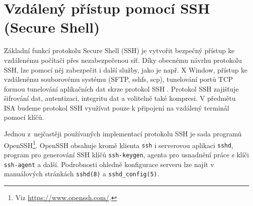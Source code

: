\section{Vzdálený přístup pomocí SSH (Secure Shell)}
\label{ssh}

Základní funkcí protokolu Secure Shell (SSH) \cite{rfc4253} je vytvořit bezpečný přístup ke vzdálenému počítači přes nezabezpečenou síť. Díky obecnému návrhu protokolu SSH, lze pomocí něj zabezpečit i další služby, jako je např. X Window, přístup ke vzdálenému  souborovému systému (SFTP, sshfs, scp), tunelování portů TCP formou tunelování aplikačních dat skrze protokol SSH . Protokol SSH zajišťuje šifrování dat, autentizaci, integritu dat a volitelně také kompresi. V předmětu ISA budeme protokol SSH využívat pouze k připojení na vzdálený terminál pomocí klíčů. 

Jednou z~nejčastěji používaných implementací protokolu SSH je sada programů OpenSSH\footnote{Viz \url{https://www.openssh.com/}.}. OpenSSH obsahuje kromě klienta {\tt ssh} i serverovou aplikaci {\tt sshd}, program
 pro generování SSH klíčů {\tt ssh-keygen}, agenta pro usnadnění práce s klíči {\tt ssh-agent}
 a další. Podrobnosti ohledně konfigurace serveru lze najít v manuálových stránkách  {\tt sshd(8)} a {\tt sshd\_config(5)}.

